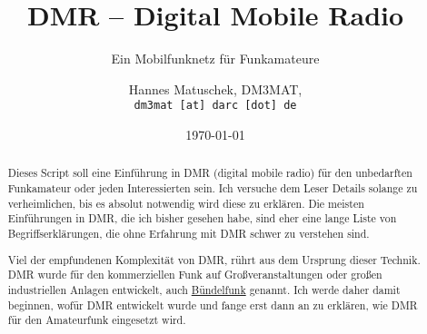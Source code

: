 \documentclass[11pt, a4paper,parskip=half]{scrartcl}
\title{DMR -- Digital Mobile Radio}
\subtitle{Ein Mobilfunknetz für Funkamateure}
\author{Hannes Matuschek, DM3MAT,\\\texttt{dm3mat [at] darc [dot] de}}
\date{\today}
\begin{document}
\begin{titlepage}
\maketitle
\vfill
\begin{abstract}
 Dieses Script soll eine Einführung in DMR (digital mobile radio) für den 
 unbedarften Funkamateur oder jeden Interessierten sein. Ich versuche dem 
 Leser Details solange zu verheimlichen, bis es absolut notwendig wird 
 diese zu erklären. Die meisten
 Einführungen in DMR, die ich bisher gesehen habe, sind eher eine lange Liste
 von Begriffserklärungen, die ohne Erfahrung mit DMR schwer zu verstehen sind. 
  
 Viel der empfundenen Komplexität von DMR, rührt aus dem Ursprung dieser 
 Technik. DMR wurde für den kommerziellen Funk auf Großveranstaltungen oder 
 großen industriellen Anlagen entwickelt, auch 
 \href{https://de.wikipedia.org/wiki/B\%C3\%BCndelfunk}{Bündelfunk} genannt. 
 Ich werde daher damit beginnen, wofür DMR entwickelt wurde und fange erst dann
 an zu erklären, wie DMR für den Amateurfunk eingesetzt wird.
\end{abstract}
\end{titlepage}
\pagebreak

\tableofcontents
\pagebreak









	













\appendix
\printindex
\end{document}
